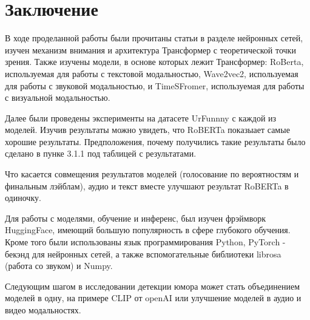 \documentclass[PMI,VKR]{HSEUniversity}
\begin{document}
\chapter{Заключение}

В ходе проделанной работы были прочитаны статьи в разделе нейронных сетей, изучен механизм внимания и архитектура Трансформер с теоретической точки зрения. Также изучены модели, в основе которых лежит Трансформер: RoBerta, используемая для работы с текстовой модальностью, Wave2vec2, используемая для работы с звуковой модальностью, и TimeSFromer, используемая для работы с визуальной модальностью. 

Далее были проведены эксперименты  на датасете UrFunnny с каждой из моделей. Изучив результаты можно увидеть, что RoBERTa показыает самые хорошие результаты. Предположения, почему получились такие результаты было сделано в пунке 3.1.1 под таблицей с результатами.

Что касается совмещения результатов моделей (голосование по вероятностям и финальным лэйблам), аудио и текст вместе улучшают результат RoBERTa в одиночку.

Для работы с моделями, обучение и инференс, был изучен фрэймворк HuggingFace, имеющий большую популярность в сфере глубокого обучения. Кроме того были использованы язык программирования Python, PyTorch - бекэнд для нейронных сетей, а также вспомогательные библиотеки librosa (работа со звуком) и Numpy.

Следующим шагом в исследовании детекции юмора может стать объединением моделей в одну, на примере CLIP от openAI или улучшение моделей в аудио и видео модальностях.




\putbibliography %
\end{document}
